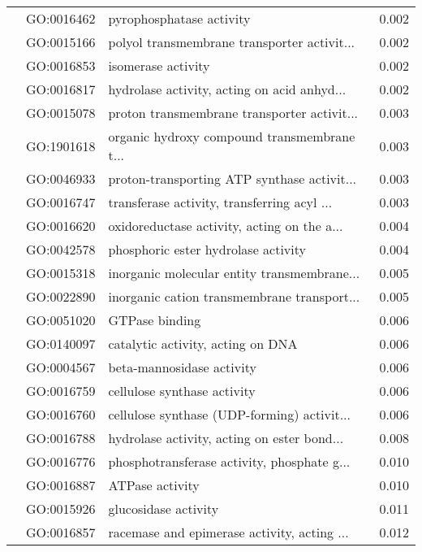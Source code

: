 \begin{longtable}{lllr}
   & GO:0016462 &                     pyrophosphatase activity &         0.002 \\
   & GO:0015166 &  polyol transmembrane transporter activit... &         0.002 \\
   & GO:0016853 &                           isomerase activity &         0.002 \\
   & GO:0016817 &  hydrolase activity, acting on acid anhyd... &         0.002 \\
   & GO:0015078 &  proton transmembrane transporter activit... &         0.003 \\
   & GO:1901618 &  organic hydroxy compound transmembrane t... &         0.003 \\
   & GO:0046933 &  proton-transporting ATP synthase activit... &         0.003 \\
   & GO:0016747 &  transferase activity, transferring acyl ... &         0.003 \\
   & GO:0016620 &  oxidoreductase activity, acting on the a... &         0.004 \\
   & GO:0042578 &          phosphoric ester hydrolase activity &         0.004 \\
   & GO:0015318 &  inorganic molecular entity transmembrane... &         0.005 \\
   & GO:0022890 &  inorganic cation transmembrane transport... &         0.005 \\
   & GO:0051020 &                               GTPase binding &         0.006 \\
   & GO:0140097 &            catalytic activity, acting on DNA &         0.006 \\
   & GO:0004567 &                    beta-mannosidase activity &         0.006 \\
   & GO:0016759 &                  cellulose synthase activity &         0.006 \\
   & GO:0016760 &  cellulose synthase (UDP-forming) activit... &         0.006 \\
   & GO:0016788 &  hydrolase activity, acting on ester bond... &         0.008 \\
   & GO:0016776 &  phosphotransferase activity, phosphate g... &         0.010 \\
   & GO:0016887 &                              ATPase activity &         0.010 \\
   & GO:0015926 &                         glucosidase activity &         0.011 \\
   & GO:0016857 &  racemase and epimerase activity, acting ... &         0.012 \\

\end{longtable}
